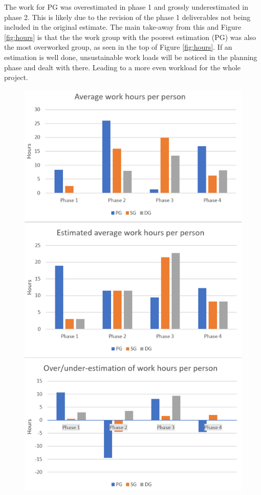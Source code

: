 \documentclass{article}
\begin{document}
The work for PG was overestimated in phase 1 and grossly underestimated in phase 2. This is likely due to the revision of the phase 1 deliverables not being included in the original estimate. The main take-away from this and Figure \ref{fig:hours} is that the the work group with the poorest estimation (PG) was also the most overworked group, as seen in the top of Figure \ref{fig:hours}. If an estimation is well done, unsustainable work loads will be noticed in the planning phase and dealt with there. Leading to a more even workload for the whole project.


\begin{figure}[h!]
    \centering
    \includegraphics[scale=0.7]{pfrFigures/hours.PNG}

\end{figure}
\end{document}

